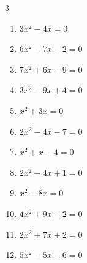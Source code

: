 \begin{multicols}{3}
\begin{enumerate}

\columnbreak %

  \item $3x^{2}-4x=0$


  \item $6x^{2}-7x-2=0$


  \item $7x^{2}+6x-9=0$


  \item $3x^{2}-9x+4=0$


  \item $x^{2}+3x=0$

        \phantom{$\displaystyle x=0, \; -3$}

  \item $2x^{2}-4x-7=0$


  \item $x^{2}+x-4=0$


\columnbreak %

  \item $2x^{2}-4x+1=0$


  \item $x^{2}-8x=0$

        \phantom{$\displaystyle x=8, \; 0$}

  \item $4x^{2}+9x-2=0$


  \item $2x^{2}+7x+2=0$


  \item $5x^{2}-5x-6=0$



\end{enumerate}
\end{multicols}
